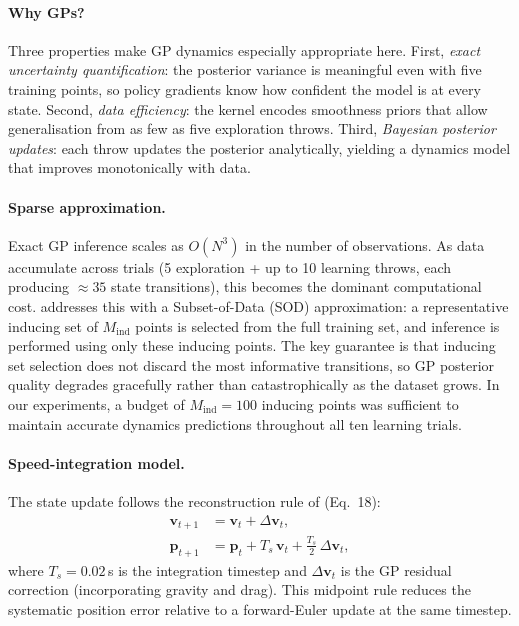 \paragraph{Why GPs?}
Three properties make GP dynamics especially appropriate here.
First, \emph{exact uncertainty quantification}: the posterior variance is meaningful
even with five training points, so policy gradients know how confident the model is at
every state.
Second, \emph{data efficiency}: the kernel encodes smoothness priors that allow
generalisation from as few as five exploration throws.
Third, \emph{Bayesian posterior updates}: each throw updates the posterior analytically,
yielding a dynamics model that improves monotonically with data.

\paragraph{Sparse approximation.}
Exact GP inference scales as $O(N^3)$ in the number of observations.
As data accumulate across trials (5 exploration + up to 10 learning throws, each
producing $\approx 35$ state transitions), this becomes the dominant computational cost.
\mcpilco{} addresses this with a Subset-of-Data (SOD) approximation: a representative
inducing set of $M_{\mathrm{ind}}$ points is selected from the full training set, and
inference is performed using only these inducing points.
The key guarantee is that inducing set selection does not discard the most informative
transitions, so GP posterior quality degrades gracefully rather than catastrophically as
the dataset grows.
In our experiments, a budget of $M_{\mathrm{ind}} = 100$ inducing points was sufficient
to maintain accurate dynamics predictions throughout all ten learning trials.

\paragraph{Speed-integration model.}
The state update follows the reconstruction rule of \cite{turcato2025mcpilot} (Eq.~18):
\begin{align}
  \mathbf{v}_{t+1} &= \mathbf{v}_t + \Delta\mathbf{v}_t, \label{eq:vel_update} \\
  \mathbf{p}_{t+1} &= \mathbf{p}_t + T_s\,\mathbf{v}_t + \tfrac{T_s}{2}\,\Delta\mathbf{v}_t,
  \label{eq:pos_update}
\end{align}
where $T_s = 0.02$\,s is the integration timestep and $\Delta\mathbf{v}_t$ is the GP
residual correction (incorporating gravity and drag).
This midpoint rule reduces the systematic position error relative to a forward-Euler
update at the same timestep.

